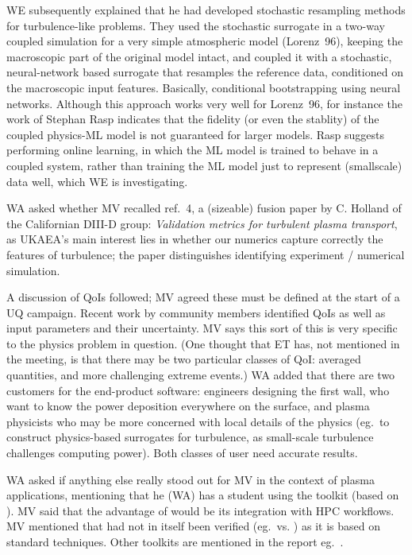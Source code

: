 WE subsequently explained that he had developed stochastic resampling methods 
for turbulence-like problems. They used the stochastic surrogate in a two-way 
coupled simulation for a very simple atmospheric model (Lorenz~96), keeping the 
macroscopic part of the original model intact, and coupled it with a 
stochastic, neural-network based surrogate that resamples the reference data, 
conditioned on the macroscopic input features. Basically, conditional 
bootstrapping using neural networks. Although this approach works very well for 
Lorenz~96, for instance the work of Stephan Rasp indicates that the fidelity 
(or even the stablity) of the coupled physics-ML model is not guaranteed for 
larger models.  Rasp suggests performing online learning, in which the ML model 
is trained to behave in a coupled system, rather than training the ML model 
just to represent (smallscale) data well, which  WE is investigating.


WA asked whether MV recalled ref.~4, a (sizeable) fusion paper by C. Holland of 
the Californian DIII-D group: {\it Validation metrics for turbulent plasma 
transport}, as UKAEA's main interest lies in whether our numerics capture 
correctly the features of turbulence; the paper distinguishes identifying 
experiment / numerical simulation.

A discussion of QoIs followed; MV agreed these must be defined at the start of 
a UQ campaign.  Recent work by  community members identified QoIs as 
well as input parameters and their uncertainty.  MV says this sort of this is 
very specific to the physics problem in question.  (One thought that ET has, 
not mentioned in the meeting, is that there may be two particular classes of 
QoI: averaged quantities, and more challenging extreme events.)  WA added that 
there are two customers for the end-product software: engineers designing the 
first wall, who want to know the power deposition everywhere on the surface, 
and plasma physicists who may be more concerned with local details of the 
physics (eg.\ to construct physics-based surrogates for turbulence, as 
small-scale turbulence challenges computing power).  Both classes of user need 
accurate results.

WA asked if anything else really stood out for MV in the context of plasma 
applications, mentioning that he (WA) has a student using the  
toolkit (based on ).  MV said that the advantage of  would 
be its integration with HPC workflows.  MV mentioned that  
had not in itself been verified (eg.\ vs. ) as it is based on 
standard techniques.  Other toolkits are mentioned in the report eg.\ 
.

